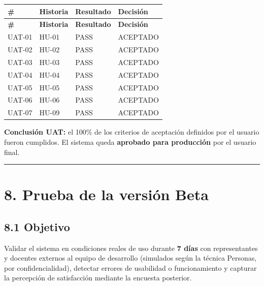 \documentclass[11pt,a4paper]{article}
\begin{document}
{\small
\begin{longtable}{|p{}|p{}|p{}|p{}|}
\rowcolor{UTECblue}\color{white}\bfseries \# & \color{white}\bfseries Historia & \color{white}\bfseries Resultado & \color{white}\bfseries Decisión \\ \hline
\endfirsthead
\rowcolor{UTECblue}\color{white}\bfseries \# & \color{white}\bfseries Historia & \color{white}\bfseries Resultado & \color{white}\bfseries Decisión \\ \hline
\endhead
UAT-01 & HU-01 & {\color{green!60!black}{$\checkmark$}} PASS & ACEPTADO \\ \hline
UAT-02 & HU-02 & {\color{green!60!black}{$\checkmark$}} PASS & ACEPTADO \\ \hline
UAT-03 & HU-03 & {\color{green!60!black}{$\checkmark$}} PASS & ACEPTADO \\ \hline
UAT-04 & HU-04 & {\color{green!60!black}{$\checkmark$}} PASS & ACEPTADO \\ \hline
UAT-05 & HU-05 & {\color{green!60!black}{$\checkmark$}} PASS & ACEPTADO \\ \hline
UAT-06 & HU-06 & {\color{green!60!black}{$\checkmark$}} PASS & ACEPTADO \\ \hline
UAT-07 & HU-09 & {\color{green!60!black}{$\checkmark$}} PASS & ACEPTADO \\ \hline
\end{longtable}}


\textbf{Conclusión UAT:} el 100\% de los criterios de aceptación definidos por el usuario fueron cumplidos. El sistema queda \textbf{aprobado para producción} por el usuario final.


\hrule\vspace{0.4em}


\section*{8. Prueba de la versión Beta}


\subsection*{8.1 Objetivo}


Validar el sistema en condiciones reales de uso durante \textbf{7 días} con representantes y docentes externos al equipo de desarrollo (simulados según la técnica Personas, por confidencialidad), detectar errores de usabilidad o funcionamiento y capturar la percepción de satisfacción mediante la encuesta posterior.
\end{document}
